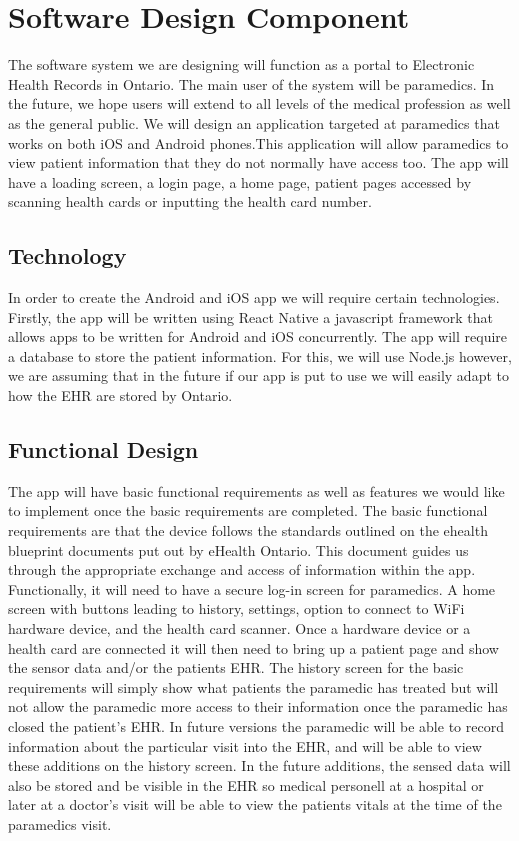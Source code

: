 
\section{Software Design Component}

The software system we are designing will function as a portal to Electronic Health Records in Ontario. The main user of the system will be paramedics. In the future, we hope users will extend to all levels of the medical profession as well as the general public.
We will design an application targeted at paramedics that works on both iOS and Android phones.This application will allow paramedics to view patient information that they do not normally have access too. The app will have a loading screen, a login page, a home page, patient pages accessed by scanning health cards or inputting the health card number.


\subsection{Technology}
In order to create the Android and iOS app we will require certain technologies.
Firstly, the app will be written using React Native a javascript framework that allows apps to be written for Android and iOS concurrently. The app will require a database to store the patient information. For this, we will use Node.js however, we are assuming that in the future if our app is put to use we will easily adapt to how the EHR are stored by Ontario.


\subsection{Functional Design}
The app will have basic functional requirements as well as features we would like to implement once the basic requirements are completed.
The basic functional requirements are that the device follows the standards outlined on the ehealth blueprint documents put out by eHealth Ontario.
This document guides us through the appropriate exchange and access of information within the app.
Functionally, it will need to have a secure log-in screen for paramedics. A home screen with buttons leading to history, settings, option to connect to WiFi hardware device, and the health card scanner.
Once a hardware device or a health card are connected it will then need to bring up a patient page and show the sensor data and/or the patients EHR. The history screen for the basic requirements will simply show what patients the paramedic has treated but will not allow the paramedic more access to their information once the paramedic has closed the patient's EHR.
In future versions the paramedic will be able to record information about the particular visit into the EHR, and will be able to view these additions on the history screen. In the future additions, the sensed data will also be stored and be visible in the EHR so medical personell at a hospital or later at a doctor's visit will be able to view the patients vitals at the time of the paramedics visit.


